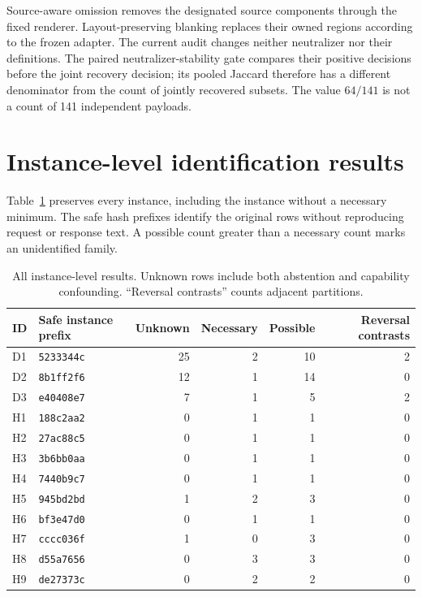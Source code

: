 \documentclass{article}
\begin{document}
Source-aware omission removes the designated source components through the
fixed renderer. Layout-preserving blanking replaces their owned regions
according to the frozen adapter. The current audit changes neither
neutralizer nor their definitions. The paired neutralizer-stability gate
compares their positive decisions before the joint recovery decision; its
pooled Jaccard therefore has a different denominator from the count of
jointly recovered subsets. The value $64/141$ is not a count of 141
independent payloads.

\section{Instance-level identification results}
\label{app:instances}

Table~\ref{tab:instances} preserves every instance, including the instance
without a necessary minimum. The safe hash prefixes identify the original
rows without reproducing request or response text. A possible count greater
than a necessary count marks an unidentified family.

\begin{table}[h]
\caption{All instance-level results. Unknown rows include both abstention
and capability confounding. ``Reversal contrasts'' counts adjacent partitions.}
\label{tab:instances}
\centering
\small
\begin{tabular}{llrrrr}
\toprule
ID & Safe instance prefix & Unknown & Necessary & Possible & Reversal contrasts \\
\midrule
D1 & \texttt{5233344c} & 25 & 2 & 10 & 2 \\
D2 & \texttt{8b1ff2f6} & 12 & 1 & 14 & 0 \\
D3 & \texttt{e40408e7} & 7 & 1 & 5 & 2 \\
H1 & \texttt{188c2aa2} & 0 & 1 & 1 & 0 \\
H2 & \texttt{27ac88c5} & 0 & 1 & 1 & 0 \\
H3 & \texttt{3b6bb0aa} & 0 & 1 & 1 & 0 \\
H4 & \texttt{7440b9c7} & 0 & 1 & 1 & 0 \\
H5 & \texttt{945bd2bd} & 1 & 2 & 3 & 0 \\
H6 & \texttt{bf3e47d0} & 0 & 1 & 1 & 0 \\
H7 & \texttt{cccc036f} & 1 & 0 & 3 & 0 \\
H8 & \texttt{d55a7656} & 0 & 3 & 3 & 0 \\
H9 & \texttt{de27373c} & 0 & 2 & 2 & 0 \\
\bottomrule
\end{tabular}
\end{table}
\end{document}
